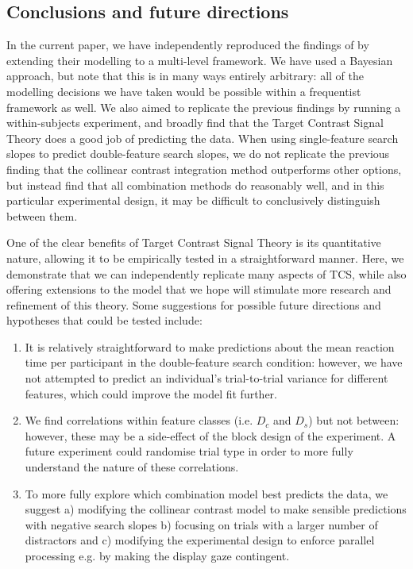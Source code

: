 \documentclass[preprint,12pt,authoryear]{elsarticle}
\begin{document}
\subsection{Conclusions and future directions}

In the current paper, we have independently reproduced the findings of \cite{buetti2019predicting} by extending their modelling to a multi-level framework. We have used a Bayesian approach, but note that this is in many ways entirely arbitrary: all of the modelling decisions we have taken would be possible within a frequentist framework as well. We also aimed to replicate the previous findings by running a within-subjects experiment, and broadly find that the Target Contrast Signal Theory does a good job of predicting the data. When using single-feature search slopes to predict double-feature search slopes, we do not replicate the previous finding that the collinear contrast integration method outperforms other options, but instead find that all combination methods do reasonably well, and in this particular experimental design, it may be difficult to conclusively distinguish between them.

One of the clear benefits of Target Contrast Signal Theory \citep{lleras2020target} is its quantitative nature, allowing it to be empirically tested in a straightforward manner. Here, we demonstrate that we can independently replicate many aspects of TCS, while also offering extensions to the model that we hope will stimulate more research and refinement of this theory. Some suggestions for possible future directions and hypotheses that could be tested include:

\begin{enumerate}
\item It is relatively straightforward to make predictions about the mean reaction time per participant in the double-feature search condition: however, we have not  attempted to predict an individual's trial-to-trial variance for different features, which could improve the model fit further.
\\
\item We find correlations within feature classes (i.e. $D_c$ and $D_s$) but not between: however, these may be a side-effect of the block design of the experiment. A future experiment could randomise trial type in order to more fully understand the nature of these correlations.
\\
\item To more fully explore which combination model best predicts the data, we suggest a) modifying the collinear contrast model to make sensible predictions with negative search slopes b) focusing on trials with a larger number of distractors and c) modifying the experimental design to enforce parallel processing e.g. by making the display gaze contingent.
\end{enumerate}
\end{document}
